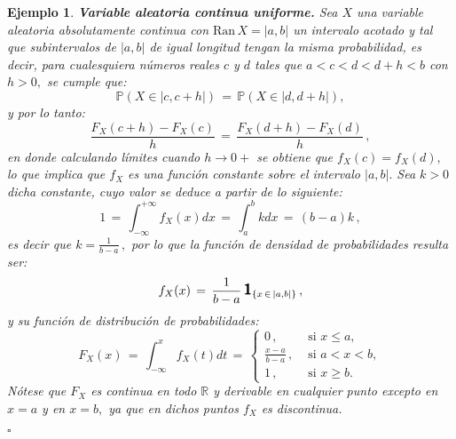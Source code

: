 \documentclass[spanish,10pt,letterpaper]{article}
\newtheorem{ejem}{Ejemplo}
\newcommand{\prob}{\mathbb{P}}
\newcommand{\Runo}{\mathbb{R}}
\newcommand{\indic}{\textbf{\textsf{\large{1}}}}
\newcommand{\qed}{\begin{flushright}$\square$\end{flushright}}
\begin{document}
	\bigskip 
	
	\begin{ejem}\label{ej:vauniforme}
		\textbf{Variable aleatoria continua uniforme.} Sea $X$ una variable aleatoria absolutamente continua con $\text{Ran}\,X=|a,b|$ un intervalo acotado y tal que subintervalos de $|a,b|$ de igual longitud tengan la misma probabilidad, es decir, para cualesquiera números reales $c$ y $d$ tales que $a<c<d<d+h<b$ con $h>0,$ se cumple que: $$\prob(X\in|c,c+h|) \,=\, \prob(X\in|d,d+h|),$$ y por lo tanto: $$\frac{F_X(c+h)-F_X(c)}{h} \,=\, \frac{F_X(d+h)-F_X(d)}{h}\,,$$
		en donde calculando límites cuando $h\rightarrow 0+$ se obtiene que $f_X(c)=f_X(d),$ lo que implica que $f_X$ es una función constante sobre el intervalo $|a,b|.$ Sea $k>0$ dicha constante, cuyo valor se deduce a partir de lo siguiente:
		$$1 \,=\, \int_{-\infty}^{+\infty}f_X(x)dx \,=\, \int_{a}^{b}kdx \,=\, (b-a)k\,,$$
		es decir que $k=\frac{1}{b-a}\,,$ por lo que la función de densidad de probabilidades resulta ser: $$f_X(x) \,=\, \frac{1}{b-a}\,\indic_{\{x\,\in\,|a,b|\}}\,,$$
		y su función de distribución de probabilidades: 
		$$F_X(x) \,=\, \int_{-\infty}^{x}f_X(t)dt \,=\, \begin{cases}
														 	0\,, & \text{ si } x \leq a, \\
														 	\frac{x-a}{b-a} \,, & \text{ si } a<x<b, \\
														 	1\,, & \text{ si } x \geq b.
		                                                \end{cases} $$
		Nótese que $F_X$ es continua en todo $\Runo$ y derivable en cualquier punto excepto en $x=a$ y en $x=b,$ ya que en dichos puntos $f_X$ es discontinua. \qed 
	\end{ejem}

	\medskip 
\end{document}
